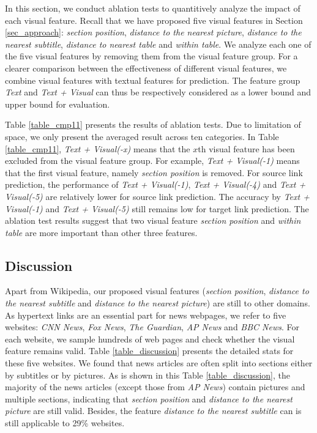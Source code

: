 In this section, we conduct ablation tests to quantitively analyze the impact of each visual feature. Recall that we have proposed five visual features in Section \ref{sec_approach}: \emph{section position}, \emph{distance to the nearest picture}, \emph{distance to the nearest subtitle}, \emph{distance to nearest table} and \emph{within table}. We analyze each one of the five visual features by removing them from the visual feature group. For a clearer comparison between the effectiveness of different visual features, we combine visual features with textual features for prediction. The feature group \emph{Text} and \emph{Text + Visual} can thus be respectively considered as a lower bound and upper bound for evaluation. 

Table \ref{table_cmp11} presents the results of ablation tests. Due to limitation of space, we only present the averaged result across ten categories. In Table \ref{table_cmp11}, \emph{Text + Visual(-x)} means that the $x$th visual feature has been excluded from the visual feature group. For example, \emph{Text + Visual(-1)} means that the first visual feature, namely \emph{section position} is removed. For source link prediction, the performance of \emph{Text + Visual(-1)}, \emph{Text + Visual(-4)} and \emph{Text + Visual(-5)} are relatively lower for source link prediction. The accuracy by \emph{Text + Visual(-1)} and \emph{Text + Visual(-5)} still remains low for target link prediction. The ablation test results suggest that two visual feature \emph{section position} and \emph{within table} are more important than other three features.

\subsection{Discussion}

Apart from Wikipedia, our proposed visual features (\emph{section position}, \emph{distance to the nearest subtitle} and \emph{distance to the nearest picture}) are still to other domains. As hypertext links are an essential part for news webpages, we refer to five websites: \emph{CNN News}, \emph{Fox News}, \emph{The Guardian}, \emph{AP News} and \emph{BBC News}. For each website, we sample hundreds of web pages and check whether the visual feature remains valid. Table \ref{table_discussion} presents the detailed stats for these five websites. We found that news articles are often split into sections either by subtitles or by pictures. As is shown in this Table \ref{table_discussion}, the majority of the news articles (except those from \emph{AP News}) contain pictures and multiple sections, indicating that \emph{section position} and \emph{distance to the nearest picture} are still valid. Besides, the feature \emph{distance to the nearest subtitle} can is still applicable to 29\% websites. 

